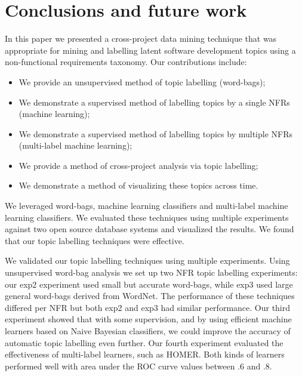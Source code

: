 \documentclass[]{sig-alternate}
\begin{document}
\section{Conclusions and future work}


In this paper we presented a cross-project data mining technique that was appropriate for mining and labelling latent software development topics using a non-functional requirements taxonomy. %
Our contributions include:
\begin{itemize}
\item We provide an unsupervised method of topic labelling (word-bags);
\item We demonstrate a supervised method of labelling topics by a single NFRs (machine learning);
\item We demonstrate a supervised method of labelling topics by multiple NFRs (multi-label machine learning);
\item We provide a method of cross-project analysis via topic labelling;
\item We demonstrate a method of visualizing these topics across time.
\end{itemize}
We leveraged word-bags, machine learning classifiers and multi-label machine learning classifiers.  
We evaluated these techniques using multiple experiments against two open source database systems and visualized the results.
We found that our topic labelling techniques were effective.

We validated our topic labelling techniques using multiple experiments.
Using unsupervised word-bag analysis we set up two NFR topic labelling experiments: 
our \textsf{exp2} experiment used small but accurate word-bags, while \textsf{exp3} used large general word-bags derived from WordNet.
The performance of these techniques differed per NFR but both \textsf{exp2} and \textsf{exp3} had similar performance.
Our third experiment showed that with some supervision, and by using efficient machine learners based on Naive Bayesian classifiers, we could improve the accuracy of automatic topic labelling even further.
Our fourth experiment evaluated the effectiveness of multi-label learners, such as HOMER. 
Both kinds of learners performed well with area under the ROC curve values between $.6$ and $.8$.
\end{document}
